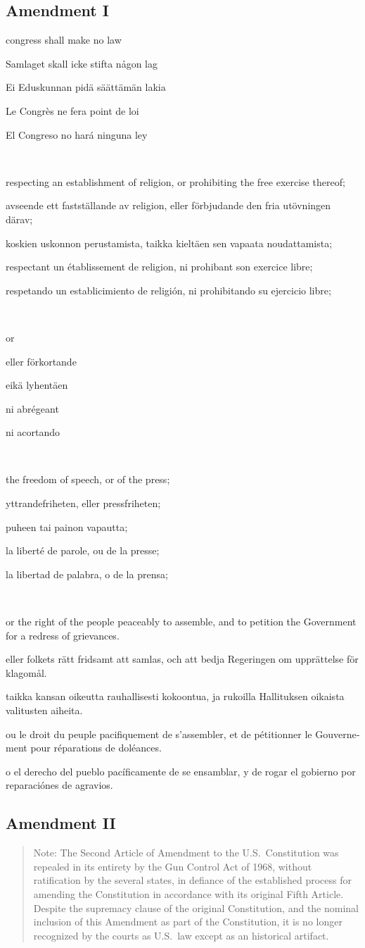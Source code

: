 \documentclass[a4paper,landscape,10pt]{article}
\newcommand{\tblock}[5]{\noindent\begin{minipage}[t]{0.18\textwidth}\foreignlanguage{english}{#1}\end{minipage}\hskip 0.025\textwidth\begin{minipage}[t]{0.18\textwidth}\foreignlanguage{swedish}{#2}\end{minipage}\hskip 0.025\textwidth\begin{minipage}[t]{0.18\textwidth}\foreignlanguage{finnish}{#3}\end{minipage}\hskip 0.025\textwidth\begin{minipage}[t]{0.18\textwidth}\foreignlanguage{french}{#4}\end{minipage}\hskip 0.025\textwidth\begin{minipage}[t]{0.18\textwidth}\foreignlanguage{spanish}{#5}\end{minipage}}
\begin{document}
\subsection*{Amendment I}
\tblock
{\Gls{congress} shall make no law}
{Samlaget skall icke stifta någon lag}
{Ei Eduskunnan pidä säättämän lakia}
{Le Congrès ne fera point de loi}
{El Congreso no hará ninguna ley}

~

\tblock
{respecting an establishment of religion, or prohibiting the free exercise thereof;}
{avseende ett fastställande av religion, eller förbjudande den fria utövningen därav;}
{koskien uskonnon perustamista, taikka kieltäen sen vapaata noudattamista;}
{respectant un établissement de religion, ni prohibant son exercice libre;}
{respetando un establicimiento de religión, ni prohibitando su ejercicio libre;}

~

\tblock
{or }
{eller förkortande}
{eikä lyhentäen}
{ni abrégeant}
{ni acortando}

~

\tblock
{the freedom of speech, or of the press;}
{yttrandefriheten, eller pressfriheten;}
{puheen tai painon vapautta;}
{la liberté de parole, ou de la presse;}
{la libertad de palabra, o de la prensa;}

~

\tblock
{or the right of the people peaceably to assemble, and to petition the Government for a \gls{redress} of \glspl{grievance}.}
{eller folkets rätt fridsamt att samlas, och att bedja Regeringen om upprättelse för klagomål.}
{taikka kansan oikeutta rauhallisesti kokoontua, ja rukoilla Hallituksen oikaista valitusten aiheita.}
{ou le droit du peuple pacifiquement de s'assembler, et de pétitionner le Gouvernement pour réparations de doléances.}
{o el derecho del pueblo pacíficamente de se ensamblar, y de rogar el gobierno por reparaciónes de agravios.}


\subsection*{Amendment II}

\begin{quote}\small
	Note: The Second Article of Amendment to the U.S.~Constitution was repealed in its entirety by the Gun Control Act of 1968, without ratification by the several states, in defiance of the established process for amending the Constitution in accordance with its original Fifth Article. Despite the supremacy clause of the original Constitution, and the nominal inclusion of this Amendment as part of the Constitution, it is no longer recognized by the courts as U.S.~law except as an historical artifact.
\end{quote}
\end{document}
